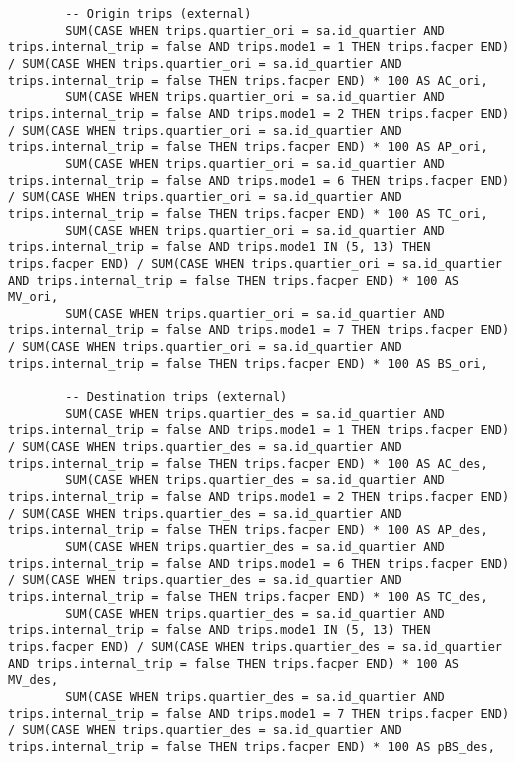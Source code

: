 \begin{lstlisting}
        -- Origin trips (external)
        SUM(CASE WHEN trips.quartier_ori = sa.id_quartier AND trips.internal_trip = false AND trips.mode1 = 1 THEN trips.facper END) / SUM(CASE WHEN trips.quartier_ori = sa.id_quartier AND trips.internal_trip = false THEN trips.facper END) * 100 AS AC_ori,
        SUM(CASE WHEN trips.quartier_ori = sa.id_quartier AND trips.internal_trip = false AND trips.mode1 = 2 THEN trips.facper END) / SUM(CASE WHEN trips.quartier_ori = sa.id_quartier AND trips.internal_trip = false THEN trips.facper END) * 100 AS AP_ori,
        SUM(CASE WHEN trips.quartier_ori = sa.id_quartier AND trips.internal_trip = false AND trips.mode1 = 6 THEN trips.facper END) / SUM(CASE WHEN trips.quartier_ori = sa.id_quartier AND trips.internal_trip = false THEN trips.facper END) * 100 AS TC_ori,
        SUM(CASE WHEN trips.quartier_ori = sa.id_quartier AND trips.internal_trip = false AND trips.mode1 IN (5, 13) THEN trips.facper END) / SUM(CASE WHEN trips.quartier_ori = sa.id_quartier AND trips.internal_trip = false THEN trips.facper END) * 100 AS MV_ori,
        SUM(CASE WHEN trips.quartier_ori = sa.id_quartier AND trips.internal_trip = false AND trips.mode1 = 7 THEN trips.facper END) / SUM(CASE WHEN trips.quartier_ori = sa.id_quartier AND trips.internal_trip = false THEN trips.facper END) * 100 AS BS_ori,

        -- Destination trips (external)
        SUM(CASE WHEN trips.quartier_des = sa.id_quartier AND trips.internal_trip = false AND trips.mode1 = 1 THEN trips.facper END) / SUM(CASE WHEN trips.quartier_des = sa.id_quartier AND trips.internal_trip = false THEN trips.facper END) * 100 AS AC_des,
        SUM(CASE WHEN trips.quartier_des = sa.id_quartier AND trips.internal_trip = false AND trips.mode1 = 2 THEN trips.facper END) / SUM(CASE WHEN trips.quartier_des = sa.id_quartier AND trips.internal_trip = false THEN trips.facper END) * 100 AS AP_des,
        SUM(CASE WHEN trips.quartier_des = sa.id_quartier AND trips.internal_trip = false AND trips.mode1 = 6 THEN trips.facper END) / SUM(CASE WHEN trips.quartier_des = sa.id_quartier AND trips.internal_trip = false THEN trips.facper END) * 100 AS TC_des,
        SUM(CASE WHEN trips.quartier_des = sa.id_quartier AND trips.internal_trip = false AND trips.mode1 IN (5, 13) THEN trips.facper END) / SUM(CASE WHEN trips.quartier_des = sa.id_quartier AND trips.internal_trip = false THEN trips.facper END) * 100 AS MV_des,
        SUM(CASE WHEN trips.quartier_des = sa.id_quartier AND trips.internal_trip = false AND trips.mode1 = 7 THEN trips.facper END) / SUM(CASE WHEN trips.quartier_des = sa.id_quartier AND trips.internal_trip = false THEN trips.facper END) * 100 AS pBS_des,


\end{lstlisting}
